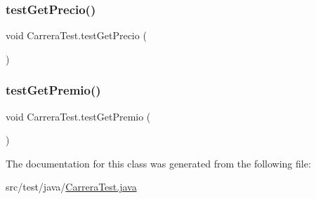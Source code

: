 \mbox{\label{class_carrera_test_abbedc0671839401d1312ddf20b60a48f}} 
\subsubsection{\texorpdfstring{testGetPrecio()}{testGetPrecio()}}
{\footnotesize\ttfamily void Carrera\+Test.\+test\+Get\+Precio (\begin{DoxyParamCaption}{ }\end{DoxyParamCaption})}

\mbox{\label{class_carrera_test_a98adb151ad831f74469b79f1c9f3c43f}} 
\subsubsection{\texorpdfstring{testGetPremio()}{testGetPremio()}}
{\footnotesize\ttfamily void Carrera\+Test.\+test\+Get\+Premio (\begin{DoxyParamCaption}{ }\end{DoxyParamCaption})}



The documentation for this class was generated from the following file\+:\begin{DoxyCompactItemize}
\item 
src/test/java/\mbox{\hyperlink{_carrera_test_8java}{Carrera\+Test.\+java}}\end{DoxyCompactItemize}
